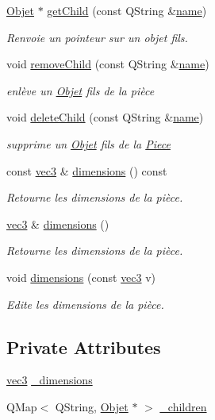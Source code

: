 \begin{DoxyCompactItemize}
\hyperlink{class_objet}{Objet} $\ast$ \hyperlink{class_piece_aa77dc9ed8493cc22d1455c3eb2bec013}{get\+Child} (const Q\+String \&\hyperlink{class_objet_a4a702c189bedcbf1e65da6aec72c8e44}{name})
\begin{DoxyCompactList}\small\item\em Renvoie un pointeur sur un objet fils. \end{DoxyCompactList}\item 
void \hyperlink{class_piece_a133ad0c10c91b183fb145fe54ea6c0f1}{remove\+Child} (const Q\+String \&\hyperlink{class_objet_a4a702c189bedcbf1e65da6aec72c8e44}{name})
\begin{DoxyCompactList}\small\item\em enlève un \hyperlink{class_objet}{Objet} fils de la pièce \end{DoxyCompactList}\item 
void \hyperlink{class_piece_a49b725ce33449c3099253288ea261349}{delete\+Child} (const Q\+String \&\hyperlink{class_objet_a4a702c189bedcbf1e65da6aec72c8e44}{name})
\begin{DoxyCompactList}\small\item\em supprime un \hyperlink{class_objet}{Objet} fils de la \hyperlink{class_piece}{Piece} \end{DoxyCompactList}\item 
const \hyperlink{structvec3}{vec3} \& \hyperlink{class_piece_afbfee8c5de17e5b046bcddd83043e5b6}{dimensions} () const 
\begin{DoxyCompactList}\small\item\em Retourne les dimensions de la pièce. \end{DoxyCompactList}\item 
\hyperlink{structvec3}{vec3} \& \hyperlink{class_piece_a3f5440ec22866d79a26a513470744412}{dimensions} ()
\begin{DoxyCompactList}\small\item\em Retourne les dimensions de la pièce. \end{DoxyCompactList}\item 
void \hyperlink{class_piece_a4419c3b0a9e57dcd215dd87be025752f}{dimensions} (const \hyperlink{structvec3}{vec3} v)
\begin{DoxyCompactList}\small\item\em Edite les dimensions de la pièce. \end{DoxyCompactList}\end{DoxyCompactItemize}
\subsection*{Private Attributes}
\begin{DoxyCompactItemize}
\item 
\hyperlink{structvec3}{vec3} \hyperlink{class_piece_a47a3458694b894041bd95a1666c9bf3d}{\+\_\+dimensions}
\item 
Q\+Map$<$ Q\+String, \hyperlink{class_objet}{Objet} $\ast$ $>$ \hyperlink{class_piece_ac80078a597e7edcd297895bab25731e6}{\+\_\+children}
\end{DoxyCompactItemize}
